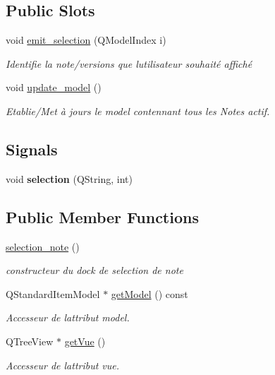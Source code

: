 \subsection*{Public Slots}
\begin{DoxyCompactItemize}
\item 
void \hyperlink{classselection__note_a70f407c89a87e5d8ce992f18ef64773d}{emit\+\_\+selection} (Q\+Model\+Index i)
\begin{DoxyCompactList}\small\item\em Identifie la note/versions que l\textquotesingle{}utilisateur souhaité affiché \end{DoxyCompactList}\item 
void \hyperlink{classselection__note_aab004424eba4264628d2e01108f2e63b}{update\+\_\+model} ()
\begin{DoxyCompactList}\small\item\em Etablie/\+Met à jours le model contennant tous les Notes actif. \end{DoxyCompactList}\end{DoxyCompactItemize}
\subsection*{Signals}
\begin{DoxyCompactItemize}
\item 
\mbox{\label{classselection__note_ae1cc0e50817dcb45975fa33c9231ef0b}} 
void {\bfseries selection} (Q\+String, int)
\end{DoxyCompactItemize}
\subsection*{Public Member Functions}
\begin{DoxyCompactItemize}
\item 
\mbox{\label{classselection__note_a69a11fa0461c0c103f099e894bf0b399}} 
\hyperlink{classselection__note_a69a11fa0461c0c103f099e894bf0b399}{selection\+\_\+note} ()
\begin{DoxyCompactList}\small\item\em constructeur du dock de selection de note \end{DoxyCompactList}\item 
Q\+Standard\+Item\+Model $\ast$ \hyperlink{classselection__note_a1fce8a25d0a91689b417fcd88fb982ca}{get\+Model} () const
\begin{DoxyCompactList}\small\item\em Accesseur de l\textquotesingle{}attribut model. \end{DoxyCompactList}\item 
Q\+Tree\+View $\ast$ \hyperlink{classselection__note_a8ebca9b8b266b7891b807a5f1af3cf2b}{get\+Vue} ()
\begin{DoxyCompactList}\small\item\em Accesseur de l\textquotesingle{}attribut vue. \end{DoxyCompactList}\end{DoxyCompactItemize}


